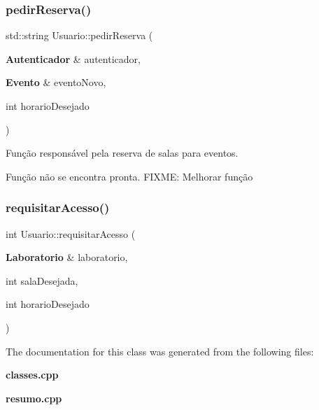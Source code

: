 \mbox{\label{class_usuario_a0f737dc773adbfccd60665f7a3a053d6}} 
\subsubsection{pedir\+Reserva()}
{\footnotesize\ttfamily std\+::string Usuario\+::pedir\+Reserva (\begin{DoxyParamCaption}\item[{\textbf{ Autenticador} \&}]{autenticador,  }\item[{\textbf{ Evento} \&}]{evento\+Novo,  }\item[{int}]{horario\+Desejado }\end{DoxyParamCaption})\hspace{0.3cm}{\ttfamily [inline]}}



Função responsável pela reserva de salas para eventos. 

Função não se encontra pronta. F\+I\+X\+ME\+: Melhorar função \mbox{\label{class_usuario_aa24978a1815ad66c45a4084b747691eb}} 
\subsubsection{requisitar\+Acesso()}
{\footnotesize\ttfamily int Usuario\+::requisitar\+Acesso (\begin{DoxyParamCaption}\item[{\textbf{ Laboratorio} \&}]{laboratorio,  }\item[{int}]{sala\+Desejada,  }\item[{int}]{horario\+Desejado }\end{DoxyParamCaption})}



The documentation for this class was generated from the following files\+:\begin{DoxyCompactItemize}
\item 
\textbf{ classes.\+cpp}\item 
\textbf{ resumo.\+cpp}\end{DoxyCompactItemize}
